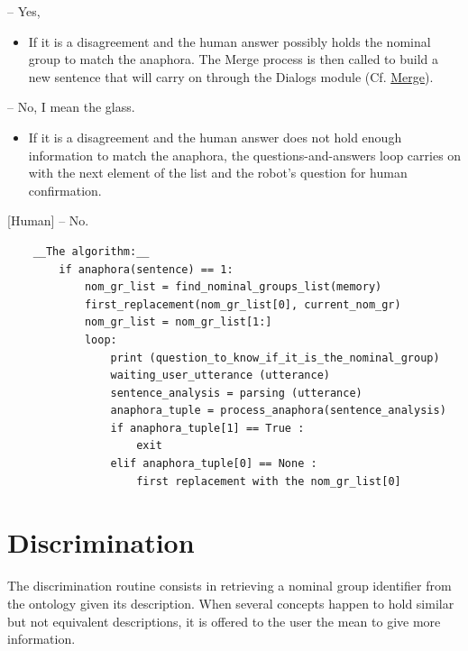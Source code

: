 \documentclass[twoside,a4paper,10pt]{report}
\begin{document}
\small
\begin{verbatimtab}
  [Human] – Yes,
\end{verbatimtab}
\normalsize

\begin{itemize}
    \item  If it is a disagreement and the human answer possibly holds the nominal group to match the anaphora. The Merge process is then called to build a new sentence that will carry on through the Dialogs module (Cf. \hyperref[65464c31b2e6ac04da1fcaa37c9bd9c7]{Merge}).
\end{itemize}

\small
\begin{verbatimtab}
  [Human] – No, I mean the glass.
\end{verbatimtab}
\normalsize

\begin{itemize}
    \item  If it is a disagreement and the human answer does not hold enough information to match the anaphora, the questions-and-answers loop carries on with the next element of the list and the robot’s question for human confirmation.
\end{itemize}

    [Human] – No.


\lstset{language=python}
\begin{lstlisting}
	__The algorithm:__
		if anaphora(sentence) == 1:
			nom_gr_list = find_nominal_groups_list(memory)
			first_replacement(nom_gr_list[0], current_nom_gr)
			nom_gr_list = nom_gr_list[1:]
			loop:
				print (question_to_know_if_it_is_the_nominal_group)
				waiting_user_utterance (utterance)
				sentence_analysis = parsing (utterance)
				anaphora_tuple = process_anaphora(sentence_analysis)
				if anaphora_tuple[1] == True :
					exit
				elif anaphora_tuple[0] == None :
					first replacement with the nom_gr_list[0]

\end{lstlisting}

\section{Discrimination}
\label{974418acf6ac4871b739b9591436865a}%

The discrimination routine consists in retrieving a nominal group identifier from the ontology given its description. 
When several concepts happen to hold similar but not equivalent descriptions, it is offered to the user the mean to give more information.
\end{document}
